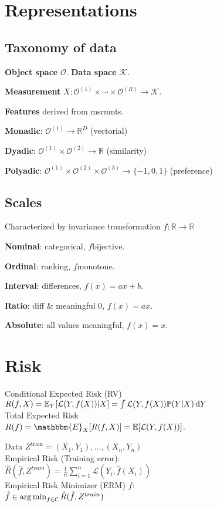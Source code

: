 \section*{Representations}
\subsection*{Taxonomy of data}
\textbf{Object space} $\mathcal{O}$. \textbf{Data space} $\mathcal{K}$.

\textbf{Measurement} $X:\mathcal{O}^{(1)}\times\cdots\times\mathcal{O}^{(R)} \rightarrow \mathcal{K}$.

\textbf{Features} derived from msrmnts.

\textbf{Monadic}: $\mathcal{O}^{(1)} \rightarrow \mathbb{R}^D$ (vectorial)

\textbf{Dyadic}: $\mathcal{O}^{(1)}\times\mathcal{O}^{(2)} \rightarrow \mathbb{R}$ (similarity)

\textbf{Polyadic}: $\mathcal{O}^{(1)}\times\mathcal{O}^{(2)}\times\mathcal{O}^{(3)} \rightarrow \{-1, 0, 1\}$ (preference)

\subsection*{Scales}

Characterized by invariance transformation $f: \mathbb{R} \rightarrow \mathbb{R}$

\textbf{Nominal}: categorical, $f \textrm{bijective}$.

\textbf{Ordinal}: ranking, $f \textrm{monotone}$.

\textbf{Interval}: differences, $f(x) = ax + b$.

\textbf{Ratio}: diff \& meaningful 0, $f(x) = ax$.

\textbf{Absolute}: all values meaningful, $f(x) = x$. 

\section*{Risk}
Conditional Expected Risk (RV)\\
$R(f, X) = \mathbb{E}_Y[\mathcal{L}(Y,f(X))|X] = \int \mathcal{L}(Y,f(X))\mathbb{P}(Y|X)\operatorname{d\!} Y$\\
Total Expected Risk\\
$R(f) = \mathbbm{E}_{X}[R(f,X)] = \E[\mathcal{L}(Y, f(X))]$.

Data $Z^\text{train}={(X_1,Y_1),...,(X_n,Y_n)}$ \\
Empirical Risk (Training error):\\
$\hat{R}(\hat{f}, Z^{train}) = \frac{1}{n} \sum_{i=1}^n \mathcal{L}(Y_i, \hat{f}(X_i))$\\
Empirical Risk Minimizer (ERM) $\hat{f}$:\\
$\hat{f} \in \operatorname*{arg\,min}_{f \in \mathcal{C}} \hat{R}(\hat{f}, Z^{train})$\\

